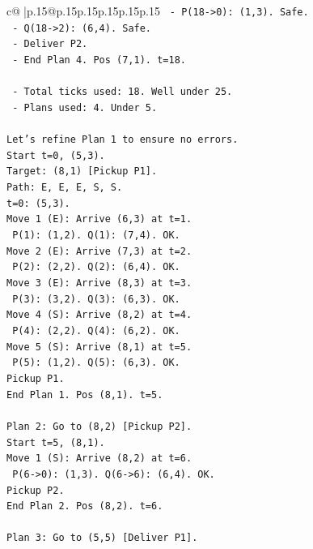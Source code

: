 \documentclass{article}
\begin{document}
{\begin{supertabular}{c@{$\;$}|p{.15\linewidth}@{}p{.15\linewidth}p{.15\linewidth}p{.15\linewidth}p{.15\linewidth}p{.15\linewidth}}
{{{\texttt{       {-} P(18{-}>0): (1,3). Safe.} \\
\texttt{       {-} Q(18{-}>2): (6,4). Safe.} \\
\texttt{     {-} Deliver P2.} \\
\texttt{     {-} End Plan 4. Pos (7,1). t=18.} \\
\\ 
\texttt{   {-} Total ticks used: 18. Well under 25.} \\
\texttt{   {-} Plans used: 4. Under 5.} \\
\\ 
\texttt{Let's refine Plan 1 to ensure no errors.} \\
\texttt{Start t=0, (5,3).} \\
\texttt{Target: (8,1) {[}Pickup P1{]}.} \\
\texttt{Path: E, E, E, S, S.} \\
\texttt{t=0: (5,3).} \\
\texttt{Move 1 (E): Arrive (6,3) at t=1.} \\
\texttt{  P(1): (1,2). Q(1): (7,4). OK.} \\
\texttt{Move 2 (E): Arrive (7,3) at t=2.} \\
\texttt{  P(2): (2,2). Q(2): (6,4). OK.} \\
\texttt{Move 3 (E): Arrive (8,3) at t=3.} \\
\texttt{  P(3): (3,2). Q(3): (6,3). OK.} \\
\texttt{Move 4 (S): Arrive (8,2) at t=4.} \\
\texttt{  P(4): (2,2). Q(4): (6,2). OK.} \\
\texttt{Move 5 (S): Arrive (8,1) at t=5.} \\
\texttt{  P(5): (1,2). Q(5): (6,3). OK.} \\
\texttt{Pickup P1.} \\
\texttt{End Plan 1. Pos (8,1). t=5.} \\
\\ 
\texttt{Plan 2: Go to (8,2) {[}Pickup P2{]}.} \\
\texttt{Start t=5, (8,1).} \\
\texttt{Move 1 (S): Arrive (8,2) at t=6.} \\
\texttt{  P(6{-}>0): (1,3). Q(6{-}>6): (6,4). OK.} \\
\texttt{Pickup P2.} \\
\texttt{End Plan 2. Pos (8,2). t=6.} \\
\\ 
\texttt{Plan 3: Go to (5,5) {[}Deliver P1{]}.} \\
}}}
\end{supertabular}}
\end{document}
